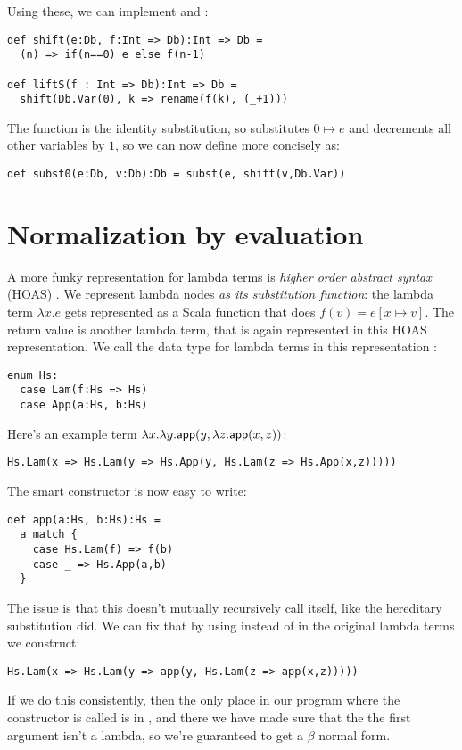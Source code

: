 Using these, we can implement  and :

\begin{lstlisting}
def shift(e:Db, f:Int => Db):Int => Db =
  (n) => if(n==0) e else f(n-1)

def liftS(f : Int => Db):Int => Db =
  shift(Db.Var(0), k => rename(f(k), (_+1)))
\end{lstlisting}

The function  is the identity substitution, so  substitutes $0 \mapsto e$ and decrements all other variables by $1$, so we can now define  more concisely as:

\begin{lstlisting}
def subst0(e:Db, v:Db):Db = subst(e, shift(v,Db.Var))
\end{lstlisting}

\section{Normalization by evaluation}

A more funky representation for lambda terms is \emph{higher order abstract syntax} (HOAS) \cite{pfenning88}.
We represent lambda nodes \emph{as its substitution function}: the lambda term $\lambda x. e$ gets represented as a Scala function that does $f(v) = e[x \mapsto v]$.
The return value is another lambda term, that is again represented in this HOAS representation.
We call the data type for lambda terms in this representation :

\begin{lstlisting}
enum Hs:
  case Lam(f:Hs => Hs)
  case App(a:Hs, b:Hs)
\end{lstlisting}

Here's an example term $\lambda x. \lambda y. \mathsf{app}(y, \lambda z. \mathsf{app}(x,z))$:
\begin{lstlisting}
Hs.Lam(x => Hs.Lam(y => Hs.App(y, Hs.Lam(z => Hs.App(x,z)))))
\end{lstlisting}

The smart constructor  is now easy to write:
\begin{lstlisting}
def app(a:Hs, b:Hs):Hs =
  a match {
    case Hs.Lam(f) => f(b)
    case _ => Hs.App(a,b)
  }
\end{lstlisting}

The issue is that this doesn't mutually recursively call itself, like the hereditary substitution did.
We can fix that by using  instead of  in the original lambda terms we construct:
\begin{lstlisting}
Hs.Lam(x => Hs.Lam(y => app(y, Hs.Lam(z => app(x,z)))))
\end{lstlisting}
If we do this consistently, then the only place in our program where the constructor  is called is in , and there we have made sure that the the first argument isn't a lambda, so we're guaranteed to get a $\beta$ normal form.

